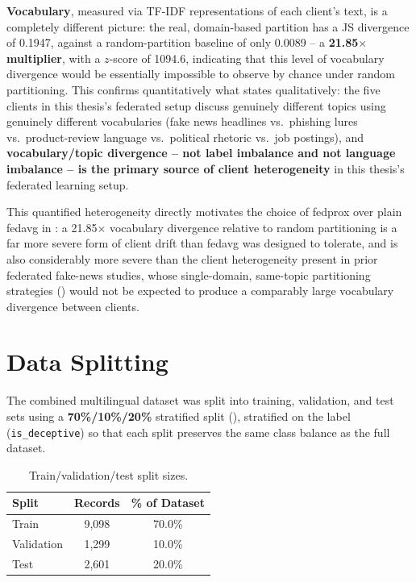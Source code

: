 \textbf{Vocabulary}, measured via TF-IDF representations of each client's text, is a completely different picture: the real, domain-based partition has a JS divergence of 0.1947, against a random-partition baseline of only 0.0089 -- a \textbf{21.85$\times$ multiplier}, with a $z$-score of 1094.6, indicating that this level of vocabulary divergence would be essentially impossible to observe by chance under random partitioning. This confirms quantitatively what  states qualitatively: the five clients in this thesis's federated setup discuss genuinely different topics using genuinely different vocabularies (fake news headlines vs.\ phishing lures vs.\ product-review language vs.\ political rhetoric vs.\ job postings), and \textbf{vocabulary/topic divergence -- not label imbalance and not language imbalance -- is the primary source of client heterogeneity} in this thesis's federated learning setup.

This quantified heterogeneity directly motivates the choice of \gls{fedprox} over plain \gls{fedavg} in : a 21.85$\times$ vocabulary divergence relative to random partitioning is a far more severe form of client drift than \gls{fedavg} was designed to tolerate, and is also considerably more severe than the client heterogeneity present in prior federated fake-news studies, whose single-domain, same-topic partitioning strategies () would not be expected to produce a comparably large vocabulary divergence between clients.

\section{Data Splitting}
\label{sec:dataset-split}

The combined multilingual dataset was split into training, validation, and test sets using a \textbf{70\%/10\%/20\%} stratified split (), stratified on the label (\texttt{is\_deceptive}) so that each split preserves the same class balance as the full dataset.

\begin{table}[htbp]
\centering
\caption{Train/validation/test split sizes.}
\label{tab:dataset-splits}
\begin{tabular}{@{}lcc@{}}
\toprule
\textbf{Split} & \textbf{Records} & \textbf{\% of Dataset} \\
\midrule
Train      & 9{,}098 & 70.0\% \\
Validation & 1{,}299 & 10.0\% \\
Test       & 2{,}601 & 20.0\% \\
\bottomrule
\end{tabular}
\end{table}


